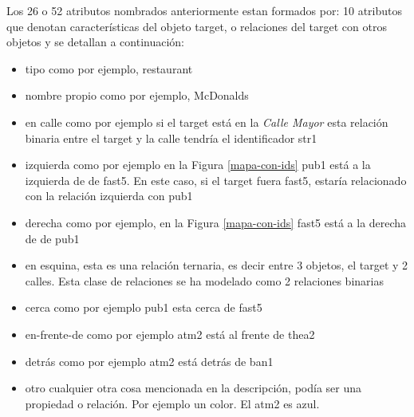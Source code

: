 Los 26 o 52 atributos nombrados anteriormente estan formados por:
10 atributos que denotan caracter\'isticas del objeto target, o relaciones del target con otros objetos y se detallan a continuaci\'on:
\begin{itemize}
  \item tipo como por ejemplo, restaurant\\[-2.2em]
  \item nombre propio como por ejemplo, McDonalds\\[-2.2em]
  \item en calle como por ejemplo si el target est\'a en la {\it Calle Mayor} esta relaci\'on binaria entre el target y la calle tendr\'ia el identificador str1\\[-2.2em]
  \item izquierda como por ejemplo en la Figura \ref{mapa-con-ids} pub1 est\'a a la izquierda de de fast5. En este caso, si el target fuera fast5, estar\'ia relacionado con la relaci\'on izquierda con pub1\\[-2.2em]
  \item derecha como por ejemplo, en la Figura \ref{mapa-con-ids} fast5 est\'a a la derecha de de pub1\\[-2.2em]
  \item en esquina, esta es una relaci\'on ternaria, es decir entre 3 objetos, el target y 2 calles. Esta clase de relaciones se ha modelado como 2 relaciones binarias\\[-2.2em]    
  \item cerca como por ejemplo pub1 esta cerca de fast5\\[-2.2em]
  \item en-frente-de como por ejemplo atm2 est\'a al frente de thea2\\[-2.2em]
  \item detr\'as como por ejemplo atm2 est\'a detr\'as de ban1\\[-2.2em]
  \item otro cualquier otra cosa mencionada en la descripci\'on, pod\'ia ser una propiedad o relaci\'on. Por ejemplo un color. El atm2 es azul.
\end{itemize}

